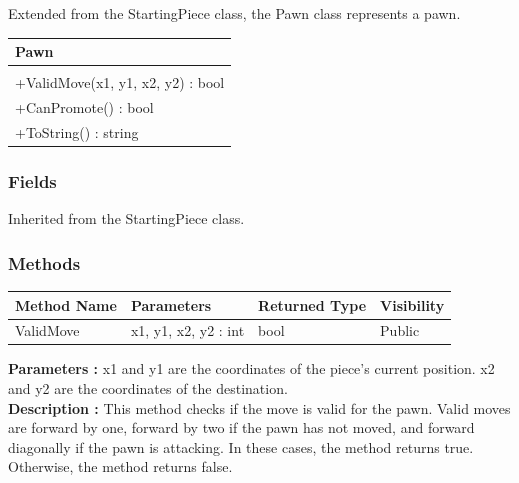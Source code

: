 \documentclass[12pt]{article}
\begin{document}
    Extended from the StartingPiece class, the Pawn class represents a pawn.
    \begin{table}[H]
        \begin{tabular}{|l|}
            \hline
            \cellcolor[HTML]{C0C0C0}\textbf{Pawn} \\ \hline
            \cellcolor[HTML]{EFEFEF}              \\ \hline
            +ValidMove(x1, y1, x2, y2) : bool     \\ \hline
            +CanPromote() : bool                  \\ \hline
            +ToString() : string                  \\ \hline
        \end{tabular}
    \end{table}

    \subsubsection{Fields}

    Inherited from the StartingPiece class.

    \subsubsection{Methods}

    \begin{table}[H]
        \begin{tabular}{|l|l|l|l|}
            \hline
            \rowcolor[HTML]{EFEFEF}
            \cellcolor[HTML]{EFEFEF}\textbf{Method Name} & \textbf{Parameters}  & \textbf{Returned Type} & \textbf{Visibility} \\ \hline
            ValidMove                                    & x1, y1, x2, y2 : int & bool                   & Public              \\ \hline
        \end{tabular}
    \end{table}

    \textbf{Parameters :} x1 and y1 are the coordinates of the piece's current position.
    x2 and y2 are the coordinates of the destination.
    \\
    \textbf{Description :} This method checks if the move is valid for the pawn.
    Valid moves are forward by one, forward by two if the pawn has not moved, and forward diagonally if the pawn is attacking.
    In these cases, the method returns true.
    Otherwise, the method returns false.
\end{document}
